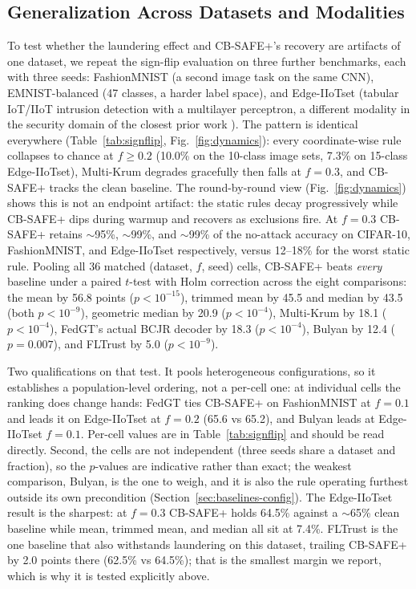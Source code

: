\documentclass[lettersize,journal]{IEEEtran}
\begin{document}
\subsection{Generalization Across Datasets and Modalities}\label{sec:general}
To test whether the laundering effect and CB-SAFE+'s recovery are artifacts of one
dataset, we repeat the sign-flip evaluation on three further benchmarks, each with
three seeds: FashionMNIST (a second image task on the same CNN), EMNIST-balanced (47
classes, a harder label space), and Edge-IIoTset (tabular IoT/IIoT intrusion
detection with a multilayer perceptron, a different modality in the security domain
of the closest prior work \cite{byzpqfl2026}). The pattern is identical everywhere
(Table~\ref{tab:signflip}, Fig.~\ref{fig:dynamics}): every coordinate-wise rule
collapses to chance at $f{\ge}0.2$ (10.0\% on the 10-class image sets, 7.3\% on
15-class Edge-IIoTset), Multi-Krum degrades gracefully then falls at $f{=}0.3$, and
CB-SAFE+ tracks the clean baseline. The round-by-round view
(Fig.~\ref{fig:dynamics}) shows this is not an endpoint artifact: the static rules
decay progressively while CB-SAFE+ dips during warmup and recovers as exclusions
fire. At $f{=}0.3$ CB-SAFE+ retains $\sim$95\%, $\sim$99\%,
and $\sim$99\% of the no-attack accuracy on CIFAR-10, FashionMNIST, and Edge-IIoTset
respectively, versus 12--18\% for the worst static rule. Pooling all 36 matched
(dataset, $f$, seed) cells, CB-SAFE+ beats \emph{every} baseline under a paired
$t$-test with Holm correction across the eight comparisons: the mean by 56.8 points
($p{<}10^{-15}$), trimmed mean by 45.5 and median by 43.5 (both $p{<}10^{-9}$),
geometric median by 20.9 ($p{<}10^{-4}$), Multi-Krum by 18.1 ($p{<}10^{-4}$), FedGT's
actual BCJR decoder by 18.3 ($p{<}10^{-4}$), Bulyan by 12.4 ($p{=}0.007$), and
FLTrust by 5.0 ($p{<}10^{-9}$).

Two qualifications on that test. It pools heterogeneous configurations, so it
establishes a population-level ordering, not a per-cell one: at individual cells the
ranking does change hands: FedGT ties CB-SAFE+ on FashionMNIST at $f{=}0.1$ and
leads it on Edge-IIoTset at $f{=}0.2$ (65.6 vs 65.2), and Bulyan leads at
Edge-IIoTset $f{=}0.1$. Per-cell values are in Table~\ref{tab:signflip} and should be
read directly. Second, the cells are not independent (three seeds share a dataset and
fraction), so the $p$-values are indicative rather than exact; the weakest comparison,
Bulyan, is the one to weigh, and it is also the rule operating furthest outside its
own precondition (Section~\ref{sec:baselines-config}). The
Edge-IIoTset result is the sharpest: at $f{=}0.3$ CB-SAFE+ holds 64.5\% against a
$\sim$65\% clean baseline while mean, trimmed mean, and median all sit at 7.4\%.
FLTrust is the one baseline that also withstands laundering on this dataset,
trailing CB-SAFE+ by 2.0 points there (62.5\% vs 64.5\%); that is the smallest
margin we report, which is why it is tested explicitly above.
\end{document}
